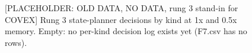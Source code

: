 \documentclass[sigconf]{acmart}
\begin{document}
{\selectfont
\begin{figure}[t]
  \centering
  
  \caption{[PLACEHOLDER: OLD DATA, NO DATA, rung 3 stand-in for COVEX] Rung 3 state-planner decisions by kind at 1x and 0.5x memory. Empty: no per-kind decision log exists yet (F7.csv has no rows).}
  \label{fig:F07_planner_decisions}
\end{figure}
}


\end{document}
